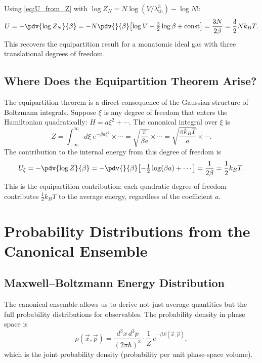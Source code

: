Using \eqref{eq:U_from_Z} with $\log Z_N = N\log(V/\lambda_{\text{th}}^3) - \log N!$:
\begin{equation}
    U = -\pdv{\log Z_N}{\beta} = -N\pdv{}{\beta}\!\left[\log V - \tfrac{3}{2}\log\beta + \text{const}\right]
      = \frac{3N}{2\beta} = \frac{3}{2}Nk_BT.
\end{equation}
This recovers the equipartition result for a monatomic ideal gas with three translational degrees of freedom.

\section{Where Does the Equipartition Theorem Arise?}

The equipartition theorem is a direct consequence of the Gaussian structure of Boltzmann
integrals.  Suppose $\xi$ is any degree of freedom that enters the Hamiltonian quadratically:
$H = a\xi^2 + \cdots$.  The canonical integral over $\xi$ is
\begin{equation}
    Z = \int_{-\infty}^{\infty} d\xi\;e^{-\beta a\xi^2}\times\cdots
      = \sqrt{\frac{\pi}{\beta a}}\times\cdots
      = \sqrt{\frac{\pi k_BT}{a}}\times\cdots.
\end{equation}
The contribution to the internal energy from this degree of freedom is
\begin{equation}
    U_\xi = -\pdv{\log Z}{\beta} = -\pdv{}{\beta}\!\left[-\tfrac{1}{2}\log(\beta a) + \cdots\right]
           = \frac{1}{2\beta} = \frac{1}{2}k_BT.
\end{equation}
This is the equipartition contribution: each quadratic degree of freedom contributes $\tfrac{1}{2}k_BT$ to the average energy, regardless of the coefficient $a$.

\chapter{Probability Distributions from the Canonical Ensemble}

\section{Maxwell--Boltzmann Energy Distribution}

The canonical ensemble allows us to derive not just average quantities but the full probability
distributions for observables.  The probability density in phase space is
\begin{equation}
    \rho(\vec{x},\vec{p}) = \frac{d^3x\,d^3p}{(2\pi\hbar)^3}\cdot\frac{1}{Z}\,e^{-\beta E(\vec{x},\vec{p})},
\end{equation}
which is the joint probability density (probability per unit phase-space volume).

